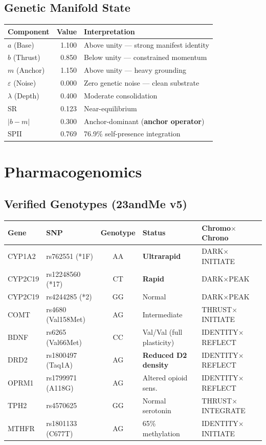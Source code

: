 \documentclass[12pt, letterpaper]{article}
\begin{document}
\subsection{Genetic Manifold State}

\begin{tabular}{lrl}
\toprule
\textbf{Component} & \textbf{Value} & \textbf{Interpretation} \\
\midrule
$a$ (Base) & 1.100 & Above unity --- strong manifest identity \\
$b$ (Thrust) & 0.850 & Below unity --- constrained momentum \\
$m$ (Anchor) & 1.150 & Above unity --- heavy grounding \\
$\varepsilon$ (Noise) & 0.000 & Zero genetic noise --- clean substrate \\
$\lambda$ (Depth) & 0.400 & Moderate consolidation \\
SR & 0.123 & Near-equilibrium \\
$|b - m|$ & 0.300 & Anchor-dominant (\textbf{anchor operator}) \\
SPII & 0.769 & 76.9\% self-presence integration \\
\bottomrule
\end{tabular}

\section{Pharmacogenomics}

\subsection{Verified Genotypes (23andMe v5)}

\begin{longtable}{llcll}
\toprule
\textbf{Gene} & \textbf{SNP} & \textbf{Genotype} & \textbf{Status} & \textbf{Chromo$\times$Chrono} \\
\midrule
\endhead
CYP1A2 & rs762551 (*1F) & AA & \textbf{Ultrarapid} & DARK$\times$INITIATE \\
CYP2C19 & rs12248560 (*17) & CT & \textbf{Rapid} & DARK$\times$PEAK \\
CYP2C19 & rs4244285 (*2) & GG & Normal & DARK$\times$PEAK \\
COMT & rs4680 (Val158Met) & AG & Intermediate & THRUST$\times$INITIATE \\
\midrule
BDNF & rs6265 (Val66Met) & CC & Val/Val (full plasticity) & IDENTITY$\times$REFLECT \\
DRD2 & rs1800497 (Taq1A) & AG & \textbf{Reduced D2 density} & IDENTITY$\times$REFLECT \\
OPRM1 & rs1799971 (A118G) & AG & Altered opioid sens. & IDENTITY$\times$REFLECT \\
TPH2 & rs4570625 & GG & Normal serotonin & THRUST$\times$INTEGRATE \\
MTHFR & rs1801133 (C677T) & AG & 65\% methylation & IDENTITY$\times$INITIATE \\
\bottomrule
\end{longtable}
\end{document}
